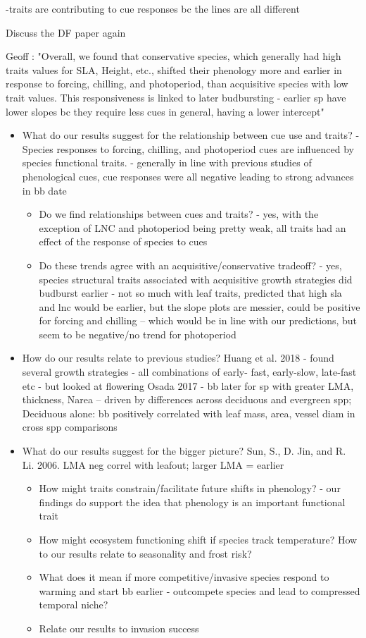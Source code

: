 \documentclass{article}\usepackage[]{graphicx}\usepackage[]{color}
\begin{document}
-traits are contributing to cue responses bc the lines are all different

Discuss the DF paper again 

Geoff : "Overall, we found that conservative species, which generally had high traits values for SLA, Height, etc., shifted their phenology more and earlier in response to forcing, chilling, and photoperiod, than acquisitive species with low trait values. This responsiveness is linked to later budbursting - earlier sp have lower slopes bc they require less cues in general, having a lower intercept"

\begin{itemize}
\item What do our results suggest for the relationship between cue use and traits? 
- Species responses to forcing, chilling, and photoperiod cues are influenced by species functional traits. 
- generally in line with previous studies of phenological cues, cue responses were all negative leading to strong advances in bb date 
	\begin{itemize}
	\item Do we find relationships between cues and traits?
	- yes, with the exception of LNC and photoperiod being pretty weak, all traits had an effect of the response of species to cues
	\item Do these trends agree with an acquisitive/conservative tradeoff?
	- yes, species structural traits associated with acquisitive growth strategies did budburst earlier
	- not so much with leaf traits, predicted that high sla and lnc would be earlier, but the slope plots are messier, could be positive for forcing and chilling -- which would be in line with our predictions, but seem to be negative/no trend for photoperiod 
	\end{itemize}
\item How do our results relate to previous studies? 
        Huang et al. 2018 - found several growth strategies - all combinations of early- fast, early-slow, late-fast etc - but looked at flowering
        Osada 2017 - bb later for sp with greater LMA, thickness, Narea – driven by differences across deciduous and evergreen spp; 	Deciduous alone: bb positively correlated with leaf mass, area, vessel diam in cross spp comparisons
\item What do our results suggest for the bigger picture?
Sun, S., D. Jin, and R. Li. 2006. LMA neg correl with leafout; larger LMA = earlier
	\begin{itemize}
	\item How might traits constrain/facilitate future shifts in phenology?
	- our findings do support the idea that phenology is an important functional trait
	\item How might ecosystem functioning shift if species track temperature? How to our results relate to seasonality and frost risk?
	\item What does it mean if more competitive/invasive species respond to warming and start bb earlier - outcompete species and lead to compressed temporal niche?
	\item Relate our results to invasion success 
	\end{itemize}


\end{itemize}
\end{document}
